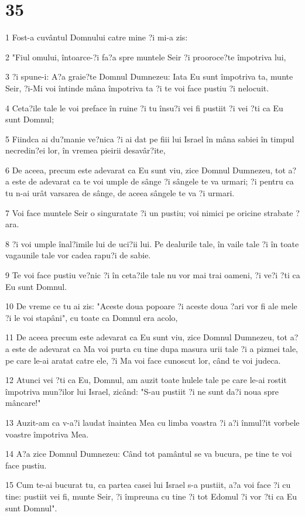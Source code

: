 \chapter{35}

\par 1 Fost-a cuvântul Domnului catre mine ?i mi-a zis:
\par 2 "Fiul omului, întoarce-?i fa?a spre muntele Seir ?i prooroce?te împotriva lui,
\par 3 ?i spune-i: A?a graie?te Domnul Dumnezeu: Iata Eu sunt împotriva ta, munte Seir, ?i-Mi voi întinde mâna împotriva ta ?i te voi face pustiu ?i nelocuit.
\par 4 Ceta?ile tale le voi preface în ruine ?i tu însu?i vei fi pustiit ?i vei ?ti ca Eu sunt Domnul;
\par 5 Fiindca ai du?manie ve?nica ?i ai dat pe fiii lui Israel în mâna sabiei în timpul necredin?ei lor, în vremea pieirii desavâr?ite,
\par 6 De aceea, precum este adevarat ca Eu sunt viu, zice Domnul Dumnezeu, tot a?a este de adevarat ca te voi umple de sânge ?i sângele te va urmari; ?i pentru ca tu n-ai urât varsarea de sânge, de aceea sângele te va ?i urmari.
\par 7 Voi face muntele Seir o singuratate ?i un pustiu; voi nimici pe oricine strabate ?ara.
\par 8 ?i voi umple înal?imile lui de uci?ii lui. Pe dealurile tale, în vaile tale ?i în toate vagaunile tale vor cadea rapu?i de sabie.
\par 9 Te voi face pustiu ve?nic ?i în ceta?ile tale nu vor mai trai oameni, ?i ve?i ?ti ca Eu sunt Domnul.
\par 10 De vreme ce tu ai zis: "Aceste doua popoare ?i aceste doua ?ari vor fi ale mele ?i le voi stapâni", cu toate ca Domnul era acolo,
\par 11 De aceea precum este adevarat ca Eu sunt viu, zice Domnul Dumnezeu, tot a?a este de adevarat ca Ma voi purta cu tine dupa masura urii tale ?i a pizmei tale, pe care le-ai aratat catre ele, ?i Ma voi face cunoscut lor, când te voi judeca.
\par 12 Atunci vei ?ti ca Eu, Domnul, am auzit toate hulele tale pe care le-ai rostit împotriva mun?ilor lui Israel, zicând: "S-au pustiit ?i ne sunt da?i noua spre mâncare!"
\par 13 Auzit-am ca v-a?i laudat înaintea Mea cu limba voastra ?i a?i înmul?it vorbele voastre împotriva Mea.
\par 14 A?a zice Domnul Dumnezeu: Când tot pamântul se va bucura, pe tine te voi face pustiu.
\par 15 Cum te-ai bucurat tu, ca partea casei lui Israel s-a pustiit, a?a voi face ?i cu tine: pustiit vei fi, munte Seir, ?i împreuna cu tine ?i tot Edomul ?i vor ?ti ca Eu sunt Domnul".

